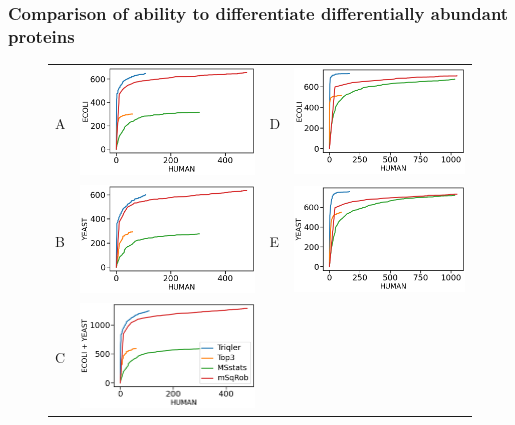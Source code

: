 \documentclass[11pt]{article}
\begin{document}
\subsubsection*{Comparison of ability to differentiate differentially abundant proteins}
\begin{figure}[hbt]
    \centering
    \begin{tabular}{lclc} 
        A & \includegraphics[width=0.4\linewidth]{../../result/report_plots/osw_de_human_vs_ecoli.png} & 
        D & \includegraphics[width=0.4\linewidth]{../../result/report_plots/diann_de_human_vs_ecoli.png} \\ 
        B & \includegraphics[width=0.4\linewidth]{../../result/report_plots/osw_de_human_vs_yeast.png} & 
        E & \includegraphics[width=0.4\linewidth]{../../result/report_plots/diann_de_human_vs_yeast.png} \\
        C & \includegraphics[width=0.45\linewidth]{../../result/report_plots/osw_de_human_vs_ecoli_and_yeast.png} & 

\end{tabular}
\end{figure}
\end{document}
